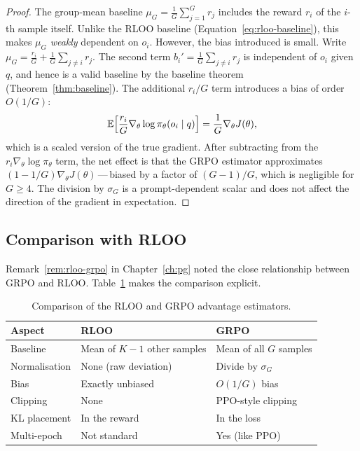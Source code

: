 \begin{proof}
The group-mean baseline $\mu_G = \frac{1}{G}\sum_{j=1}^G r_j$ includes the reward $r_i$ of the $i$-th sample itself.  Unlike the RLOO baseline (Equation~\eqref{eq:rloo-baseline}), this makes $\mu_G$ \emph{weakly} dependent on $o_i$.  However, the bias introduced is small.  Write $\mu_G = \frac{r_i}{G} + \frac{1}{G}\sum_{j \neq i} r_j$.  The second term $b_i' = \frac{1}{G}\sum_{j \neq i} r_j$ is independent of $o_i$ given $q$, and hence is a valid baseline by the baseline theorem (Theorem~\ref{thm:baseline}).  The additional $r_i / G$ term introduces a bias of order $O(1/G)$:
\[
\operatorname{\mathbb{E}}\!\left[\frac{r_i}{G} \nabla_\theta \log \pi_\theta(o_i \mid q)\right] = \frac{1}{G}\nabla_\theta J(\theta),
\]
which is a scaled version of the true gradient.  After subtracting from the $r_i \nabla_\theta \log \pi_\theta$ term, the net effect is that the GRPO estimator approximates $(1 - 1/G)\nabla_\theta J(\theta)$\,---\,biased by a factor of $(G-1)/G$, which is negligible for $G \geq 4$.  The division by $\sigma_G$ is a prompt-dependent scalar and does not affect the direction of the gradient in expectation.
\end{proof}

\subsection{Comparison with RLOO}

Remark~\ref{rem:rloo-grpo} in Chapter~\ref{ch:pg} noted the close relationship between GRPO and RLOO.  Table~\ref{tab:grpo-vs-rloo} makes the comparison explicit.

\begin{table}[ht]
\centering
\caption{Comparison of the RLOO and GRPO advantage estimators.}
\label{tab:grpo-vs-rloo}
\footnotesize
\begin{tabular}{@{}lll@{}}
\toprule
\textbf{Aspect} & \textbf{RLOO} & \textbf{GRPO} \\
\midrule
Baseline & Mean of $K-1$ other samples & Mean of all $G$ samples \\
Normalisation & None (raw deviation) & Divide by $\sigma_G$ \\
Bias & Exactly unbiased & $O(1/G)$ bias \\
Clipping & None & PPO-style clipping \\
KL placement & In the reward & In the loss \\
Multi-epoch & Not standard & Yes (like PPO) \\
\bottomrule
\end{tabular}
\end{table}

